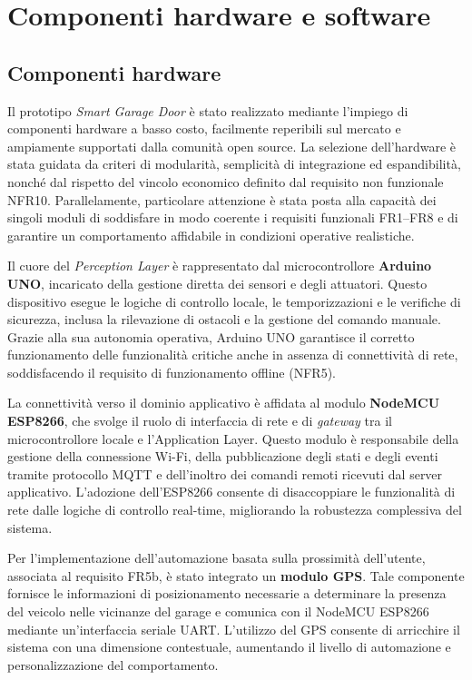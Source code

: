 \section{Componenti hardware e software}

\subsection{Componenti hardware}

Il prototipo \textit{Smart Garage Door} è stato realizzato mediante l’impiego di
componenti hardware a basso costo, facilmente reperibili sul mercato e
ampiamente supportati dalla comunità open source. La selezione dell’hardware è
stata guidata da criteri di modularità, semplicità di integrazione ed
espandibilità, nonché dal rispetto del vincolo economico definito dal requisito
non funzionale NFR10. Parallelamente, particolare attenzione è stata posta alla
capacità dei singoli moduli di soddisfare in modo coerente i requisiti
funzionali FR1–FR8 e di garantire un comportamento affidabile in condizioni
operative realistiche.

Il cuore del \textit{Perception Layer} è rappresentato dal microcontrollore
\textbf{Arduino UNO}, incaricato della gestione diretta dei sensori e degli
attuatori. Questo dispositivo esegue le logiche di controllo locale, le
temporizzazioni e le verifiche di sicurezza, inclusa la rilevazione di ostacoli
e la gestione del comando manuale. Grazie alla sua autonomia operativa, Arduino
UNO garantisce il corretto funzionamento delle funzionalità critiche anche in
assenza di connettività di rete, soddisfacendo il requisito di funzionamento
offline (NFR5).

La connettività verso il dominio applicativo è affidata al modulo
\textbf{NodeMCU ESP8266}, che svolge il ruolo di interfaccia di rete e di
\textit{gateway} tra il microcontrollore locale e l’Application Layer. Questo
modulo è responsabile della gestione della connessione Wi-Fi, della
pubblicazione degli stati e degli eventi tramite protocollo MQTT e
dell’inoltro dei comandi remoti ricevuti dal server applicativo. L’adozione
dell’ESP8266 consente di disaccoppiare le funzionalità di rete dalle logiche di
controllo real-time, migliorando la robustezza complessiva del sistema.

Per l’implementazione dell’automazione basata sulla prossimità dell’utente,
associata al requisito FR5b, è stato integrato un \textbf{modulo GPS}. Tale
componente fornisce le informazioni di posizionamento necessarie a determinare
la presenza del veicolo nelle vicinanze del garage e comunica con il NodeMCU
ESP8266 mediante un’interfaccia seriale UART. L’utilizzo del GPS consente di
arricchire il sistema con una dimensione contestuale, aumentando il livello di
automazione e personalizzazione del comportamento.

